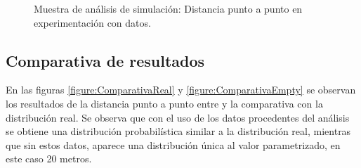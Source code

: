 \begin{figure}[!htb]
\begin{minipage}{0.48\textwidth}
\caption{Muestra de análisis de simulación: Distancia punto a punto en experimentación con datos.}
\label{figure:SimulatedPointToPoint}
\end{minipage}
\end{figure}
\newpage

\subsection{Comparativa de resultados}
En las figuras \ref{figure:ComparativaReal} y \ref{figure:ComparativaEmpty} se observan los resultados de la distancia punto a punto entre y la comparativa con la distribución real. Se observa que con el uso de los datos 
procedentes del análisis se obtiene una distribución probabilística similar a la distribución real, mientras que 
sin estos datos, aparece una distribución única al valor parametrizado, en este caso 20 metros.

